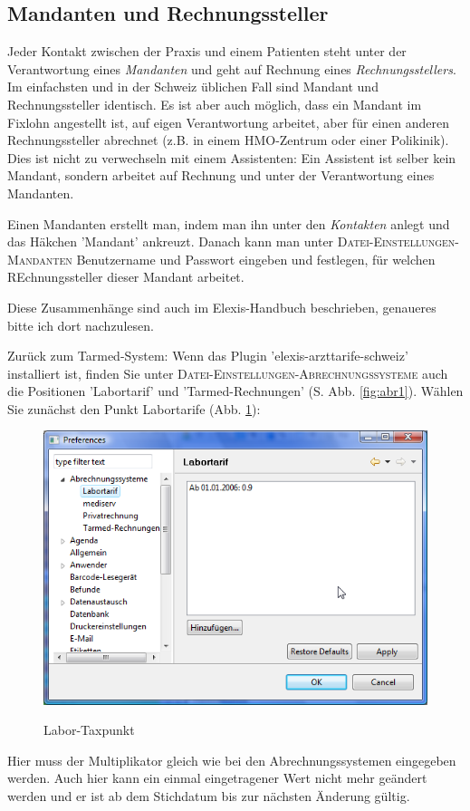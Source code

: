 \documentclass[a4paper]{scrartcl}
\begin{document}
\subsection{Mandanten und Rechnungssteller}
Jeder Kontakt zwischen der Praxis und einem Patienten steht unter der Verantwortung eines \textit{Mandanten} und geht auf Rechnung eines \textit{Rechnungsstellers}. Im einfachsten und in der Schweiz üblichen Fall sind Mandant und Rechnungssteller identisch. Es ist aber auch möglich, dass ein Mandant im Fixlohn angestellt ist, auf eigen Verantwortung arbeitet, aber für einen anderen Rechnungssteller abrechnet (z.B. in einem HMO-Zentrum oder einer Polikinik). Dies ist nicht zu verwechseln mit einem Assistenten: Ein Assistent ist selber kein Mandant, sondern arbeitet auf Rechnung und unter der Verantwortung eines Mandanten.

\medskip

Einen Mandanten erstellt man, indem man ihn unter den \textit{Kontakten} anlegt und das Häkchen 'Mandant' ankreuzt. Danach kann man unter \textsc{Datei-Einstellungen-Mandanten} Benutzername und Passwort eingeben und festlegen, für welchen REchnungssteller dieser Mandant arbeitet.

Diese Zusammenhänge sind auch im Elexis-Handbuch beschrieben, genaueres bitte ich dort nachzulesen.

\medskip

Zurück zum Tarmed-System: Wenn das Plugin 'elexis-arzttarife-schweiz' installiert ist, finden Sie unter \textsc{Datei-Einstellungen-Abrechnungssysteme} auch die Positionen 'Labortarif' und 'Tarmed-Rechnungen' (S. Abb. \ref{fig:abr1}). Wählen Sie zunächst den Punkt Labortarife (Abb. \ref{fig:abr3}):
\begin{figure}
  \includegraphics{abr3}\\
  \caption{Labor-Taxpunkt}\label{fig:abr3}
\end{figure}
Hier muss der Multiplikator gleich wie bei den Abrechnungssystemen eingegeben werden. Auch hier kann ein einmal eingetragener Wert nicht mehr geändert werden und er ist ab dem Stichdatum bis zur nächsten Änderung gültig.
\end{document}
